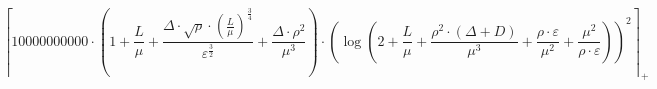 \[\left\lceil 10000000000 \cdot \left(1 + \frac{L}{\mu} + \frac{\Delta \cdot \sqrt{\rho} \cdot \left(\frac{L}{\mu}\right)^{\frac{3}{4}}}{\varepsilon^{\frac{3}{2}}} + \frac{\Delta \cdot \rho^{2}}{\mu^{3}}\right) \cdot \left(\log\left(2 + \frac{L}{\mu} + \frac{\rho^{2} \cdot \left(\Delta + D\right)}{\mu^{3}} + \frac{\rho \cdot \varepsilon}{\mu^{2}} + \frac{\mu^{2}}{\rho \cdot \varepsilon}\right)\right)^{2} \right\rceil_{+}\]
